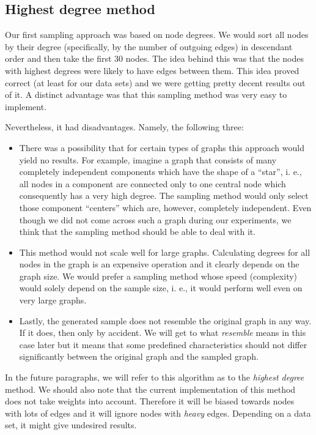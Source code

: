 \subsection{Highest degree method}

Our first sampling approach was based on node degrees. We would sort all nodes by their degree (specifically, by the number of outgoing edges) in descendant order and then take the first 30 nodes. The idea behind this was that the nodes with highest degrees were likely to have edges between them. This idea proved correct (at least for our data sets) and we were getting pretty decent results out of it. A distinct advantage was that this sampling method was very easy to implement.

Nevertheless, it had disadvantages. Namely, the following three:

\begin{itemize}
\item There was a possibility that for certain types of graphs this approach would yield no results. For example, imagine a graph that consists of many completely independent components which have the shape of a “star”, i. e., all nodes in a component are connected only to one central node which consequently has a very high degree. The sampling method would only select those component “centers” which are,  however, completely independent. Even though we did not come across such a graph during our experiments, we think that the sampling method should be able to deal with it.
\item This method would not scale well for large graphs. Calculating degrees for all nodes in the graph is an expensive operation and it clearly depends on the graph size. We would prefer a sampling method whose speed (complexity) would solely depend on the sample size, i. e., it would perform well even on very large graphs.
\item Lastly, the generated sample does not resemble the original graph in any way. If it does, then only by accident. We will get to what \emph{resemble} means in this case later but it means that some predefined characteristics should not differ significantly between the original graph and the sampled graph.

\end{itemize}
In the future paragraphs, we will refer to this algorithm as to the \emph{highest degree} method. We should also note that the current implementation of this method does not take weights into account. Therefore it will be biased towards nodes with lots of edges and it will ignore nodes with \emph{heavy} edges. Depending on a data set, it might give undesired results.

